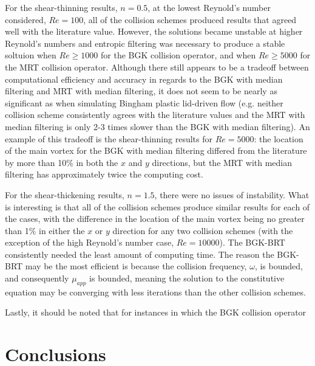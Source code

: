 For the shear-thinning results, $n = 0.5$, at the lowest Reynold's number considered, $Re = 100$, all of the collision schemes produced results that agreed well with the literature value.
However, the solutions became unstable at higher Reynold's numbers and entropic filtering was necessary to produce a stable soltuion when $Re \ge 1000$ for the BGK collision operator, and when $Re \ge 5000$ for the MRT collision operator.
Although there still appears to be a tradeoff between computational efficiency and accuracy in regards to the BGK with median filtering and MRT with median filtering, it does not seem to be nearly as significant as when simulating Bingham plastic lid-driven flow (e.g. neither collision scheme consistently agrees with the literature values and the MRT with median filtering is only 2-3 times slower than the BGK with median filtering).
An example of this tradeoff is the shear-thinning results for $Re = 5000$: the location of the main vortex for the BGK with median filtering differed from the literature by more than 10\% in both the $x$ and $y$ directions, but the MRT with median filtering has approximately twice the computing cost.

For the shear-thickening results, $n = 1.5$, there were no issues of instability.
What is interesting is that all of the collision schemes produce similar results for each of the cases, with the difference in the location of the main vortex being no greater than 1\% in either the $x$ or $y$ direction for any two collision schemes (with the exception of the high Reynold's number case, $Re = 10000$).
The BGK-BRT consistently needed the least amount of computing time.
The reason the BGK-BRT may be the most efficient is because the collision frequency, $\omega$, is bounded, and consequently $\mu_{app}$ is bounded, meaning the solution to the constitutive equation may be converging with less iterations than the other collision schemes.

Lastly, it should be noted that for instances in which the BGK collision operator 

\section{Conclusions} \label{sec:numerical-study-conclusions}

